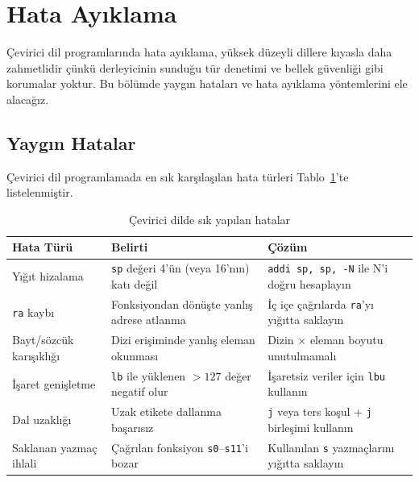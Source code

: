 \section{Hata Ayıklama}
\label{sec:hata-ayiklama}

Çevirici dil programlarında hata ayıklama, yüksek düzeyli dillere kıyasla daha zahmetlidir çünkü derleyicinin sunduğu tür denetimi ve bellek güvenliği gibi korumalar yoktur. Bu bölümde yaygın hataları ve hata ayıklama yöntemlerini ele alacağız.

\subsection{Yaygın Hatalar}
\label{subsec:yaygın-hatalar}

Çevirici dil programlamada en sık karşılaşılan hata türleri Tablo~\ref{tab:yaygın-hatalar}'te listelenmiştir.

\begin{table}[H]
\centering
\caption[Çevirici dilde sık yapılan hatalar]{Çevirici dilde sık yapılan hatalar}
\label{tab:yaygın-hatalar}
\small
\begin{tabularx}{\textwidth}{l X X}
\toprule
\textbf{Hata Türü} & \textbf{Belirti} & \textbf{Çözüm} \\
\midrule
Yığıt hizalama & \texttt{sp} değeri 4'ün (veya 16'nın) katı değil & \texttt{addi sp, sp, -N} ile N'i doğru hesaplayın \\
\texttt{ra} kaybı & Fonksiyondan dönüşte yanlış adrese atlanma & İç içe çağrılarda \texttt{ra}'yı yığıtta saklayın \\
Bayt/sözcük karışıklığı & Dizi erişiminde yanlış eleman okunması & Dizin $\times$ eleman boyutu unutulmamalı \\
İşaret genişletme & \texttt{lb} ile yüklenen $> 127$ değer negatif olur & İşaretsiz veriler için \texttt{lbu} kullanın \\
Dal uzaklığı & Uzak etikete dallanma başarısız & \texttt{j} veya ters koşul + \texttt{j} birleşimi kullanın \\
Saklanan yazmaç ihlali & Çağrılan fonksiyon \texttt{s0}--\texttt{s11}'i bozar & Kullanılan \texttt{s} yazmaçlarını yığıtta saklayın \\
\bottomrule
\end{tabularx}
\end{table}


